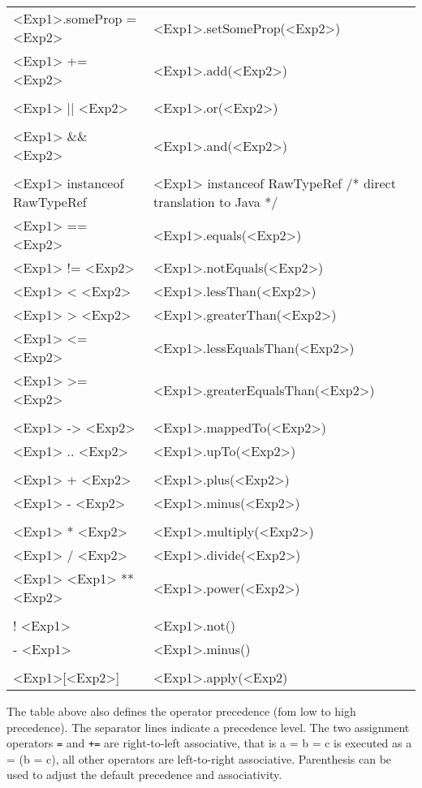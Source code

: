 \documentclass[a4paper,10pt]{scrreprt}
\begin{document}
\begin{tabular}{p{}p{}}
<Exp1>.someProp = <Exp2>&<Exp1>.setSomeProp(<Exp2>)\\
<Exp1> += <Exp2>&<Exp1>.add(<Exp2>)\\
 & \\
<Exp1> || <Exp2>&<Exp1>.or(<Exp2>)\\
 & \\
<Exp1> \&\& <Exp2>&<Exp1>.and(<Exp2>)\\
 & \\
<Exp1> instanceof RawTypeRef&<Exp1> instanceof RawTypeRef /* direct translation to Java */\\
<Exp1> == <Exp2>&<Exp1>.equals(<Exp2>)\\
<Exp1> != <Exp2>&<Exp1>.notEquals(<Exp2>)\\
<Exp1> < <Exp2>&<Exp1>.lessThan(<Exp2>)\\
<Exp1> > <Exp2>&<Exp1>.greaterThan(<Exp2>)\\
<Exp1> <= <Exp2>&<Exp1>.lessEqualsThan(<Exp2>)\\
<Exp1> >= <Exp2>&<Exp1>.greaterEqualsThan(<Exp2>)\\
 & \\
<Exp1> -> <Exp2>&<Exp1>.mappedTo(<Exp2>)\\
<Exp1> .. <Exp2>&<Exp1>.upTo(<Exp2>)\\
 & \\
<Exp1> + <Exp2>&<Exp1>.plus(<Exp2>)\\
<Exp1> - <Exp2>&<Exp1>.minus(<Exp2>)\\
 & \\
<Exp1> * <Exp2>&<Exp1>.multiply(<Exp2>)\\
<Exp1> / <Exp2>&<Exp1>.divide(<Exp2>)\\
<Exp1> %
<Exp1> ** <Exp2>&<Exp1>.power(<Exp2>)\\
 & \\
! <Exp1>&<Exp1>.not()\\
- <Exp1>&<Exp1>.minus()\\
 & \\
<Exp1>[<Exp2>]&<Exp1>.apply(<Exp2)
\end{tabular}


		
The table above also defines the operator precedence (fom low to high precedence). The separator lines indicate a precedence level. 
The two assignment operators \lstinline{=}
 and \lstinline{+=}
 are right-to-left associative, that is a = b = c is executed as a = (b = c), all other
operators are left-to-right associative. Parenthesis can be used to adjust the default precedence and associativity. 
\end{document}
